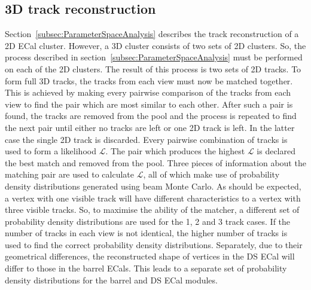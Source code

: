 \subsection{3D track reconstruction}
\label{subsec:3DHoughTrackReconstruction}
Section~\ref{subsec:ParameterSpaceAnalysis} describes the track reconstruction of a 2D ECal cluster.  However, a 3D cluster consists of two sets of 2D clusters.  So, the process described in section~\ref{subsec:ParameterSpaceAnalysis} must be performed on each of the 2D clusters.  The result of this process is two sets of 2D tracks.  To form full 3D tracks, the tracks from each view must now be matched together.  This is achieved by making every pairwise comparison of the tracks from each view to find the pair which are most similar to each other.  After such a pair is found, the tracks are removed from the pool and the process is repeated to find the next pair until either no tracks are left or one 2D track is left.  In the latter case the single 2D track is discarded. Every pairwise combination of tracks is used to form a likelihood $\mathcal{L}$.  The pair which produces the highest $\mathcal{L}$ is declared the best match and removed from the pool.  Three pieces of information about the matching pair are used to calculate $\mathcal{L}$, all of which make use of probability density distributions generated using beam Monte Carlo.  
\newline
\newline
As should be expected, a vertex with one visible track will have different characteristics to a vertex with three visible tracks.  So, to maximise the ability of the matcher, a different set of probability density distributions are used for the 1, 2 and 3 track cases.  If the number of tracks in each view is not identical, the higher number of tracks is used to find the correct probability density distributions.  Separately, due to their geometrical differences, the reconstructed shape of vertices in the DS ECal will differ to those in the barrel ECals.  This leads to a separate set of probability density distributions for the barrel and DS ECal modules.
\newline
\newline
